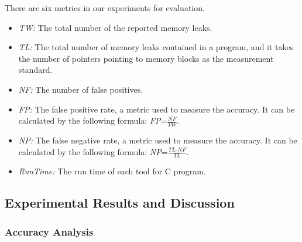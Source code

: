 There are six metrics in our experiments for evaluation.
\begin{itemize}
\item \textit{TW:} The total number of the reported memory leaks.
\item \textit{TL:} The total number of memory leaks contained in a program, and it takes the number of pointers pointing to memory blocks as the measurement standard.
\item \textit{NF:} The number of false positives.
\item \textit{FP:} The false positive rate, a metric used to measure the accuracy. It can be calculated by the following formula: \textit{FP}=$\frac{\textit{NF}}{\textit{TW}}$.
\item \textit{NP:} The false negative rate, a metric used to measure the accuracy. It can be calculated by the following formula: \textit{NP}=$\frac{\textit{TL-NF}}{\textit{TL}}$.
\item \textit{RunTime:} The run time of each tool for C program.
\end{itemize}
\subsection{Experimental Results and Discussion}


\subsubsection{Accuracy Analysis}

\ 



